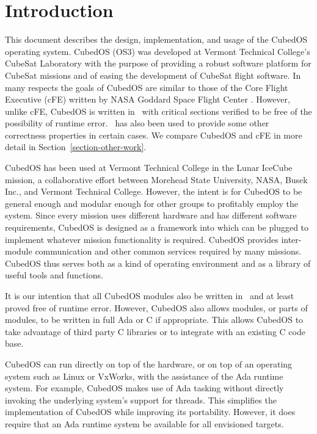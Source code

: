 \chapter{Introduction}
\label{chapt:introduction}

This document describes the design, implementation, and usage of the CubedOS operating system.
CubedOS (OS3) was developed at Vermont Technical College's CubeSat Laboratory with the purpose
of providing a robust software platform for CubeSat missions and of easing the development of
CubeSat flight software. In many respects the goals of CubedOS are similar to those of the Core
Flight Executive (cFE) written by NASA Goddard Space Flight Center \cite{cFE}. However, unlike
cFE, CubedOS is written in \SPARK\ with critical sections verified to be free of the possibility
of runtime error. \SPARK\ has also been used to provide some other correctness properties in
certain cases. We compare CubedOS and cFE in more detail in Section~\ref{section-other-work}.

CubedOS has been used at Vermont Technical College in the Lunar IceCube mission, a collaborative
effort between Morehead State University, NASA, Busek Inc., and Vermont Technical College.
 However, the intent is for CubedOS to be general enough and modular
enough for other groups to profitably employ the system. Since every mission uses different
hardware and has different software requirements, CubedOS is designed as a framework into which
 can be plugged to implement whatever mission functionality is required.
CubedOS provides inter-module communication and other common services required by many missions.
CubedOS thus serves both as a kind of operating environment and as a library of useful tools and
functions.

It is our intention that all CubedOS modules also be written in \SPARK\ and at least proved free
of runtime error. However, CubedOS also allows modules, or parts of modules, to be written in
full Ada or C if appropriate. This allows CubedOS to take advantage of third party C libraries
or to integrate with an existing C code base.

CubedOS can run directly on top of the hardware, or on top of an operating system such as Linux
or VxWorks, with the assistance of the Ada runtime system. For example, CubedOS makes use of Ada
tasking without directly invoking the underlying system's support for threads. This simplifies
the implementation of CubedOS while improving its portability. However, it does require that an
Ada runtime system be available for all envisioned targets.

